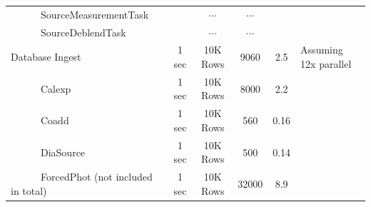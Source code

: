 \documentclass[prd, nofootinbib, floatfix, 11pt,tightenlines,times]{article}
\begin{document}
\begin{table}
\begin{center}
\begin{tabular}{lccccl}
~~~~~~SourceMeasurementTask   &               & $\cdots$     & $\cdots$        &        &  \\
~~~~~~SourceDeblendTask       &               & $\cdots$     & $\cdots$        &        &  \\
\hline
Database Ingest               & 1 sec      & 10K Rows     & 9060     & 2.5     & Assuming 12x parallel  \\
~~~~~~Calexp                  & 1 sec      & 10K Rows     & 8000     & 2.2     &  \\
~~~~~~Coadd                   & 1 sec      & 10K Rows     & 560      & 0.16    &  \\
~~~~~~DiaSource               & 1 sec      & 10K Rows     & 500      & 0.14    &  \\
~~~~~~ForcedPhot (not included in total)& 1 sec      & 10K Rows      & 32000   & 8.9    &  \\
\hline
\hline
\end{tabular}
\end{center}
\end{table}
\end{document}
